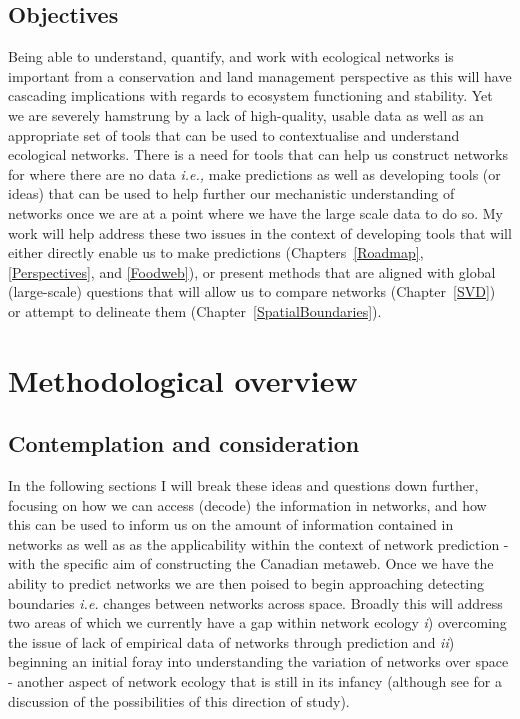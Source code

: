 \subsection{Objectives}\label{objectives-and-hypotheses}

Being able to understand, quantify, and work with ecological networks is
important from a conservation and land management perspective as this
will have cascading implications with regards to ecosystem functioning
and stability. Yet we are severely hamstrung by a lack of high-quality,
usable data as well as an appropriate set of tools that can be used to
contextualise and understand ecological networks. There is a need for
tools that can help us construct networks for where there are no data
\emph{i.e.,} make predictions as well as developing tools (or ideas) that
can be used to help further our mechanistic understanding of networks once
we are at a point where we have the large scale data to do so. My work will
help address these two issues in the context of developing tools that will
either directly enable us to make predictions (Chapters~\ref{Roadmap},
\ref{Perspectives}, and \ref{Foodweb}), or present methods that are aligned
with global (large-scale) questions that will allow us to compare networks
(Chapter~\ref{SVD}) or attempt to delineate them 
(Chapter~\ref{SpatialBoundaries}).

\section{Methodological overview}

\subsection{Contemplation and consideration}

In the following sections I will break these ideas and questions down
further, focusing on how we can access (decode) the information in
networks, and how this can be used to inform us on the amount of
information contained in networks as well as as the applicability within
the context of network prediction - with the specific aim of
constructing the Canadian metaweb. Once we have the ability to predict
networks we are then poised to begin approaching detecting boundaries
\emph{i.e.} changes between networks across space. Broadly this will
address two areas of which we currently have a gap within network
ecology \emph{i}) overcoming the issue of lack of empirical data of
networks \cite{Poisot2021GloKno} through prediction and \emph{ii})
beginning an initial foray into understanding the variation of networks
over space - another aspect of network ecology that is still in its
infancy (although see \cite{Fortin2021NetEcoa} for a discussion of the
possibilities of this direction of study).

